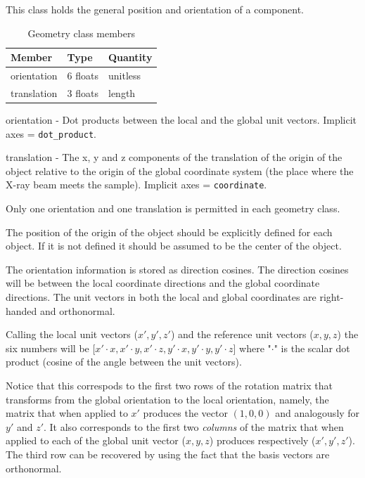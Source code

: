 \documentclass[usletter,11pt]{article}
\newcommand{\member}[2]
{ \noindent
{ \color{softBlue}  #1 - } #2
\vspace{0.2cm}
}
\begin{document}
This class holds the general position and orientation of a component.

\begin{table}[h!]\sffamily \footnotesize
\caption{Geometry class members}

\begin{tabular}{p{4.5cm} p{4.5cm}  p{2.5cm} }
\toprule
\bfseries Member     & \bfseries Type & \bfseries Quantity \\
\midrule

orientation & 6 floats & unitless \\
translation & 3 floats & length \\
\bottomrule
\end{tabular}
\end{table}

\member{orientation}{Dot products between the local and the global unit
  vectors. Implicit axes = {\tt dot\_product}.}

\member{translation}{The x, y and z components of the translation of the origin of the object
 relative to the origin of the global coordinate system (the place
 where the X-ray beam meets the sample). Implicit axes = {\tt coordinate}.}

Only one orientation and one translation is permitted in each geometry
class.

The position of the origin of the object should be explicitly defined for each
object. If it is not defined it should be assumed to be the center of
the object.

The orientation information is stored as direction cosines. The
direction cosines will be between the local coordinate directions and
the global coordinate directions. The unit vectors in both the
local and global coordinates are right-handed and orthonormal. 

Calling the local unit vectors ($x',y',z'$) and the reference unit vectors
($x,y,z$) the six numbers will be [$x' \cdot x, x' \cdot y, x' \cdot z, y' \cdot
x, y'  \cdot y, y' \cdot z$] where "$\cdot$" is the scalar dot product (cosine
of the angle between the unit vectors). 

Notice that this correspods to the first two rows of the rotation
matrix that transforms from the global orientation to the local
orientation, namely, the matrix that when applied to $x'$ produces
the vector $(1,0,0)$ and analogously for $y'$ and $z'$.
It also corresponds to the first two {\em columns} of
the matrix that when applied to each of the global unit vector
($x,y,z$) produces respectively ($x',y',z'$).
The third row can be recovered by using the fact that the
basis vectors are orthonormal.
\end{document}
